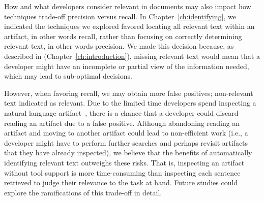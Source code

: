 How and what developers consider relevant in
documents may also impact how techniques trade-off
precision versus recall. 
In Chapter~\ref{ch:identifying}, we indicated
the techniques we explored favored locating
all relevant text within an
artifact, in other words recall, rather
than focusing on 
correctly determining relevant text, in other
words precision. 
We made this decision because, as described in 
 (Chapter~\ref{ch:introduction}),
missing relevant text would mean that a developer might have an incomplete or partial view of the information needed, which may lead to
sub-optimal decisions.














However, when favoring recall,  we may obtain more false positives; non-relevant text indicated as relevant.
Due to the limited time developers spend inspecting a natural language artifact~\cite{Starke2009}, there is a chance that
 a developer could discard reading an artifact due to a false positive. 
 Although abandoning reading an artifact and moving to another artifact could lead to non-efficient work
 (i.e., a developer might have to perform further searches and perhaps revisit artifacts that they have already inspected),
we believe that the benefits of automatically identifying relevant text outweighs these risks. 
That is, inspecting an artifact without tool support is more time-consuming
than inspecting each sentence retrieved to judge their relevance to the task at hand. 
Future studies could explore the ramifications
of this trade-off in detail.

